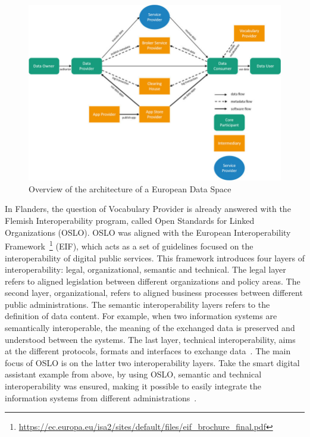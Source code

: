 \documentclass[manuscript]{acmart}
\begin{document}
\begin{figure}[h]
  \centering
  \includegraphics[width=\linewidth]{images/data-space}
  \caption{Overview of the architecture of a European Data Space\protect\footnotemark}
  \label{architectureDataSpace}
\end{figure}


In Flanders, the question of Vocabulary Provider is already answered with the Flemish Interoperability program, called Open Standards for Linked Organizations (OSLO). 
OSLO was aligned with the European Interoperability Framework~\footnote{\url{https://ec.europa.eu/isa2/sites/default/files/eif_brochure_final.pdf}} (EIF), which acts as a set of guidelines focused on the interoperability of digital public services.
This framework introduces four layers of interoperability: legal, organizational, semantic and technical.
The legal layer refers to aligned legislation between different organizations and policy areas. 
The second layer, organizational, refers to aligned business processes between different public administrations. 
The semantic interoperability layers refers to the definition of data content. 
For example, when two information systems are semantically interoperable, the meaning of the exchanged data is preserved and understood between the systems. 
The last layer, technical interoperability, aims at the different protocols, formats and interfaces to exchange data~\cite{eif}.
The main focus of OSLO is on the latter two interoperability layers.
Take the smart digital assistant example from above, by using OSLO, semantic and technical interoperability was ensured, making it possible to easily integrate the information systems from different administrations~\cite{buyle2018semantics}.
\end{document}
